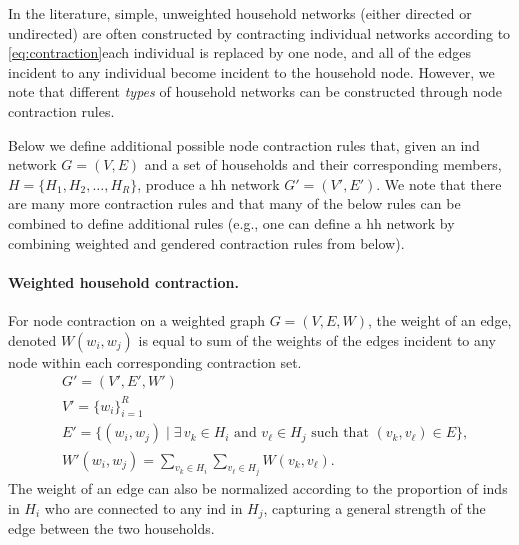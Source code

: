 In the literature, simple, unweighted household networks (either directed or undirected) are often constructed by contracting individual networks according to \cref{eq:contraction}\textemdash each individual is replaced by one node, and all of the edges incident to any individual become incident to the household node. However, we note that different \textit{types} of household networks can be constructed through node contraction rules. 

Below we define additional possible node contraction rules that, given an \acl{ind} network $G = (V, E)$ and a set of households and their corresponding members, $H = \{ H_1, H_2, \dots, H_R\}$, produce a \acl{hh} network $G' = (V', E')$. We note that there are many more contraction rules and that many of the below rules can be combined to define additional rules (e.g., one can define a \acl{hh} network by combining weighted and gendered contraction rules from below).


\paragraph{Weighted household contraction.} 
For node contraction on a weighted graph $G= (V, E, W)$, the weight of an edge, denoted $W(w_i, w_j)$ is equal to sum of the weights of the edges incident to any node within each corresponding contraction set. 
\begin{equation*} \label{eq:weighted_con}
    \begin{aligned}
    &G' = (V', E', W')\\
    &V' = \{ w_i \}_{i=1}^{R} \\
    &E' = \{ (w_i, w_j) \mid \exists \, v_k \in H_i \textrm{ and } v_\ell \in H_j \textrm{ such that } (v_k, v_\ell) \in E \},\\
    &W'(w_i, w_j) = \sum_{v_k \in H_i} \sum_{v_\ell \in H_j} W(v_k, v_\ell). 
\end{aligned}
\end{equation*}
The weight of an edge can also be normalized according to the proportion of \acl{inds} in $H_i$ who are connected to any \acl{ind} in $H_j$, capturing a general strength of the edge between the two households. 

